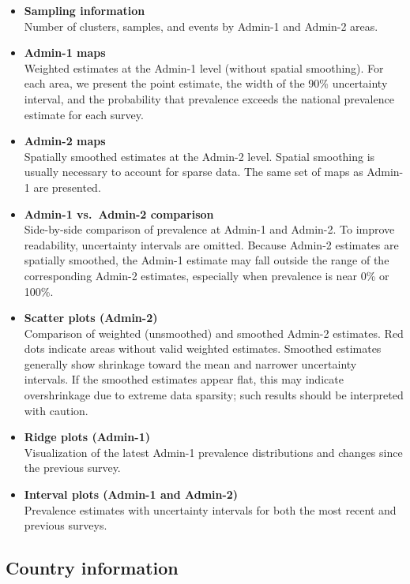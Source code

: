 \documentclass[
]{article}
\begin{document}
\begin{itemize}
\item
  \textbf{Sampling information}\\
  Number of clusters, samples, and events by Admin-1 and Admin-2 areas.
\item
  \textbf{Admin-1 maps}\\
  Weighted estimates at the Admin-1 level (without spatial smoothing). For each area, we present the point estimate, the width of the 90\% uncertainty interval, and the probability that prevalence exceeds the national prevalence estimate for each survey.
\item
  \textbf{Admin-2 maps}\\
  Spatially smoothed estimates at the Admin-2 level. Spatial smoothing is usually necessary to account for sparse data. The same set of maps as Admin-1 are presented.
\item
  \textbf{Admin-1 vs.~Admin-2 comparison}\\
  Side-by-side comparison of prevalence at Admin-1 and Admin-2. To improve readability, uncertainty intervals are omitted. Because Admin-2 estimates are spatially smoothed, the Admin-1 estimate may fall outside the range of the corresponding Admin-2 estimates, especially when prevalence is near 0\% or 100\%.
\item
  \textbf{Scatter plots (Admin-2)}\\
  Comparison of weighted (unsmoothed) and smoothed Admin-2 estimates. Red dots indicate areas without valid weighted estimates. Smoothed estimates generally show shrinkage toward the mean and narrower uncertainty intervals. If the smoothed estimates appear flat, this may indicate overshrinkage due to extreme data sparsity; such results should be interpreted with caution.
\item
  \textbf{Ridge plots (Admin-1)}\\
  Visualization of the latest Admin-1 prevalence distributions and changes since the previous survey.
\item
  \textbf{Interval plots (Admin-1 and Admin-2)}\\
  Prevalence estimates with uncertainty intervals for both the most recent and previous surveys.
\end{itemize}

\newpage

\subsection{Country information}\label{country-information}
\end{document}
